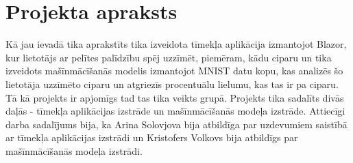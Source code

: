 \section{Projekta apraksts}

    Kā jau ievadā tika aprakstīts tika izveidota tīmekļa aplikācija izmantojot Blazor, kur lietotājs
    ar pelītes palīdzību spēj uzzīmēt, piemēram, kādu ciparu un tika izveidots mašīnmācīšanās modelis
    izmantojot MNIST datu kopu, kas analizēs šo lietotāja uzzīmēto ciparu un atgriezīs procentuālu
    lielumu, kas tas ir pa ciparu. Tā kā projekts ir apjomīgs tad tas tika veikts grupā. Projekts tika
    sadalīts divās daļās - tīmekļa aplikācijas izstrāde un mašīnmācīšanās modeļa izstrāde. Attiecīgi
    darba sadalījums bija, ka Arina Solovjova bija atbildīga par uzdevumiem saistībā ar tīmekļa
    aplikācijas izstrādi un Kristofers Volkovs bija atbildīgs par mašīnmācīšanās modeļa izstrādi.

